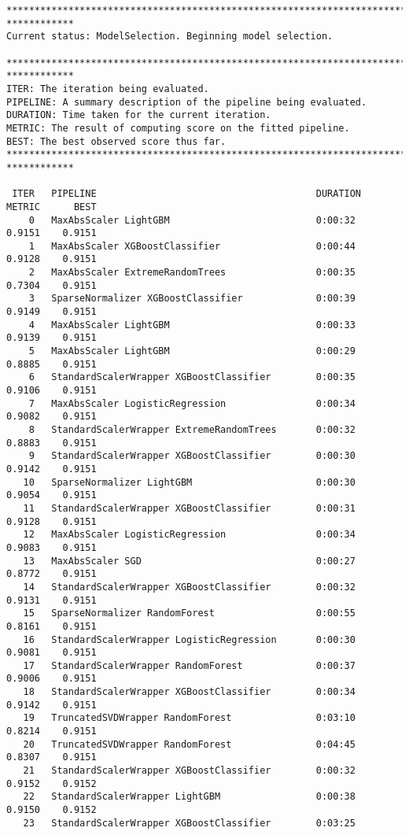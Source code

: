 \documentclass[11pt]{article}
\begin{document}
\begin{Verbatim}[commandchars=\\\{\}]
********************************************************************************
************
Current status: ModelSelection. Beginning model selection.

********************************************************************************
************
ITER: The iteration being evaluated.
PIPELINE: A summary description of the pipeline being evaluated.
DURATION: Time taken for the current iteration.
METRIC: The result of computing score on the fitted pipeline.
BEST: The best observed score thus far.
********************************************************************************
************

 ITER   PIPELINE                                       DURATION
METRIC      BEST
    0   MaxAbsScaler LightGBM                          0:00:32
0.9151    0.9151
    1   MaxAbsScaler XGBoostClassifier                 0:00:44
0.9128    0.9151
    2   MaxAbsScaler ExtremeRandomTrees                0:00:35
0.7304    0.9151
    3   SparseNormalizer XGBoostClassifier             0:00:39
0.9149    0.9151
    4   MaxAbsScaler LightGBM                          0:00:33
0.9139    0.9151
    5   MaxAbsScaler LightGBM                          0:00:29
0.8885    0.9151
    6   StandardScalerWrapper XGBoostClassifier        0:00:35
0.9106    0.9151
    7   MaxAbsScaler LogisticRegression                0:00:34
0.9082    0.9151
    8   StandardScalerWrapper ExtremeRandomTrees       0:00:32
0.8883    0.9151
    9   StandardScalerWrapper XGBoostClassifier        0:00:30
0.9142    0.9151
   10   SparseNormalizer LightGBM                      0:00:30
0.9054    0.9151
   11   StandardScalerWrapper XGBoostClassifier        0:00:31
0.9128    0.9151
   12   MaxAbsScaler LogisticRegression                0:00:34
0.9083    0.9151
   13   MaxAbsScaler SGD                               0:00:27
0.8772    0.9151
   14   StandardScalerWrapper XGBoostClassifier        0:00:32
0.9131    0.9151
   15   SparseNormalizer RandomForest                  0:00:55
0.8161    0.9151
   16   StandardScalerWrapper LogisticRegression       0:00:30
0.9081    0.9151
   17   StandardScalerWrapper RandomForest             0:00:37
0.9006    0.9151
   18   StandardScalerWrapper XGBoostClassifier        0:00:34
0.9142    0.9151
   19   TruncatedSVDWrapper RandomForest               0:03:10
0.8214    0.9151
   20   TruncatedSVDWrapper RandomForest               0:04:45
0.8307    0.9151
   21   StandardScalerWrapper XGBoostClassifier        0:00:32
0.9152    0.9152
   22   StandardScalerWrapper LightGBM                 0:00:38
0.9150    0.9152
   23   StandardScalerWrapper XGBoostClassifier        0:03:25

\end{Verbatim}
\end{document}
